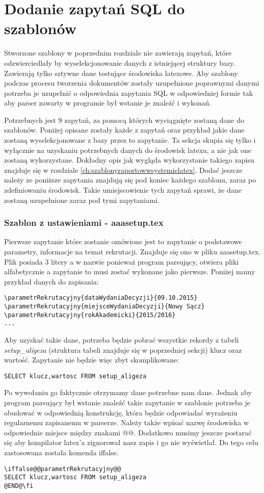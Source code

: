 \section{Dodanie zapytań SQL do szablonów}

Stworzone szablony w poprzednim rozdziale nie zawierają zapytań, które odzwierciedlały by wyselekcjonowanie danych z istniejącej struktury bazy. Zawierają tylko sztywne dane testujące środowiska latexowe. Aby szablony podczas procesu tworzenia dokumentów zostały uzupełnione poprawnymi danymi potrzeba je uzupełnić o odpowiednia zapytania SQL w odpowiedniej formie tak aby parser zawarty w programie był wstanie je znaleźć i wykonań.
\par 
Potrzebnych jest 9 zapytań, za pomocą których wyciągnięte zostaną dane do szablonów. Poniżej opisane zostały każde z zapytań oraz przykład jakie dane zostaną wyselekcjonowane z bazy przez to zapytanie. Ta sekcja skupia się tylko i wyłącznie na uzyskaniu potrzebnych danych do środowisk latexu, a nie jak one zostaną wykorzystane. Dokładny opis jak wygląda wykorzystanie takiego zapisu znajduje się w rozdziale \ref{ch:szablonyraportowwsystemielatex}. Dodać jeszcze należy ze poniższe zapytania znajdują się pod koniec każdego szablonu, zaraz po zdefiniowaniu środowisk. Takie umiejscowienie tych zapytań sprawi, że dane zostaną uzupełnione zaraz pod tymi zapytaniami.
\par 
\subsubsection*{Szablon z ustawieniami - aaasetup.tex}
Pierwsze zapytanie które zostanie omówione jest to  zapytanie o podstawowe parametry, informacje na temat rekrutacji. Znajduje się ono w pliku aaasetup.tex. Plik posiada 3 litery a w nazwie ponieważ program parsujący, otwiera pliki alfabetycznie a zapytanie to musi zostać wykonane jako pierwsze.  Poniżej mamy przykład danych do zapisania:
 \begin{lstlisting}
\parametrRekrutacyjny{dataWydaniaDecyzji}{09.10.2015}
\parametrRekrutacyjny{miejsceWydaniaDecyzji}{Nowy Sącz}
\parametrRekrutacyjny{rokAkademicki}{2015/2016}
...
\end{lstlisting}
Aby uzyskać takie dane, potrzeba będzie pobrać wszystkie rekordy z tabeli \emph{setup\_aligeza} (struktura tabeli znajduje się w poprzedniej sekcji) klucz oraz wartość. Zapytanie nie będzie więc zbyt skomplikowane:
 \begin{lstlisting}
SELECT klucz,wartosc FROM setup_aligeza
\end{lstlisting}
Po wywołaniu go faktycznie otrzymamy dane potrzebne nam dane. Jednak aby program parsujący był wstanie znaleźć takie zapytanie w szablonie potrzeba je obudować w odpowiednią konstrukcję, która będzie odpowiadać wyrażeniu regularnemu zapisanemu w parserze. Należy także wpisać nazwę środowiska w odpowiednie miejsce między znakami @@. Dodatkowo musimy jeszcze postarać się aby kompilator latex'a zignorował nasz zapis i go nie wyświetlał. Do tego celu zastosowana została komenda iffalse.
 \begin{lstlisting}
\iffalse@@parametrRekrutacyjny@@
SELECT klucz,wartosc FROM setup_aligeza
@END@\fi
\end{lstlisting}
